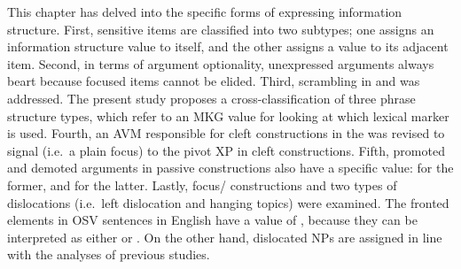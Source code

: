 This chapter has delved into the specific forms of expressing
information structure. First,  sensitive items are
classified into two subtypes; one assigns an
information structure value to itself, and the other assigns a value
to its adjacent item.  Second, in terms of argument
optionality, unexpressed arguments always
beart  because focused items cannot be elided. Third,
scrambling in  and  was addressed. The
present study proposes a cross-classification of three phrase
structure types, which refer to an MKG value for looking at which
lexical marker is used. Fourth, an AVM
responsible for cleft constructions in the  was revised to
signal  (i.e.\ a plain focus) to the pivot XP in cleft
constructions.  Fifth, promoted and demoted arguments in passive
constructions also have a specific 
value:  for the former, and
 for the latter.  Lastly, focus/
 constructions and two types of dislocations
(i.e.\ left dislocation and hanging topics) were
examined. The fronted elements in OSV sentences in English have a
value of , because they can be interpreted as
either  or . On the
other hand, dislocated NPs are assigned  in line
with the analyses of previous studies.




